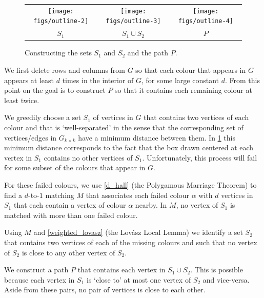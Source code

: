 \documentclass{patmorin}
\begin{document}
\begin{figure}
  \begin{center}
    \begin{tabular}{ccc}
      \texttt{[image: figs/outline-2]} &
      \texttt{[image: figs/outline-3]} &
      \texttt{[image: figs/outline-4]} \\
      $S_1$ & $S_1\cup S_2$ & $P$
    \end{tabular}
  \end{center}
  \caption{Constructing the sets $S_1$ and $S_2$ and the path $P$.}
  \label{outline}
\end{figure}
\begin{compactenum}

  \item We first delete rows and columns from $G$ so that each colour that appears in $G$ appears at least $d$ times in the interior of $G$, for some large constant $d$.  From this point on the goal is to construct $P$ so that it contains each remaining colour at least twice.

  \item We greedily choose a set $S_1$ of vertices in $G$ that contains two vertices of each colour and that is `well-separated' in the sense that the corresponding set of vertices/edges in $G_{k\times k}$ have a minimum distance between them.  In \cref{outline} this minimum distance corresponds to the fact that the box drawn centered at each vertex in $S_1$ contains no other vertices of $S_1$.
  Unfortunately, this process will fail for some subset of the colours that appear in $G$.

  \item For these failed colours, we use \cref{d_hall} (the Polygamous Marriage Theorem) to find a $d$-to-$1$ matching $M$ that associates each failed colour $\alpha$ with $d$ vertices in $S_1$ that each contain a vertex of colour $\alpha$ nearby.  In $M$, no vertex of $S_1$ is matched with more than one failed colour.

  \item Using $M$ and \cref{weighted_lovasz} (the Lovász Local Lemma) we identify a set $S_2$ that contains two vertices of each of the missing colours and such that no vertex of $S_2$ is close to any other vertex of $S_2$.

  \item We construct a path $P$ that contains each vertex in $S_1\cup S_2$.  This is possible because each vertex in $S_1$ is `close to' at most one vertex of $S_2$ and vice-versa.  Aside from these pairs, no pair of vertices is close to each other.
\end{compactenum}
\end{document}
